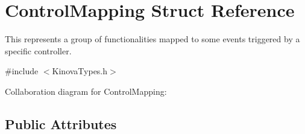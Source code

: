 \hypertarget{struct_control_mapping}{}\section{Control\+Mapping Struct Reference}
\label{struct_control_mapping}


This represents a group of functionalities mapped to some events triggered by a specific controller.  




{\ttfamily \#include $<$Kinova\+Types.\+h$>$}



Collaboration diagram for Control\+Mapping\+:
\subsection*{Public Attributes}
